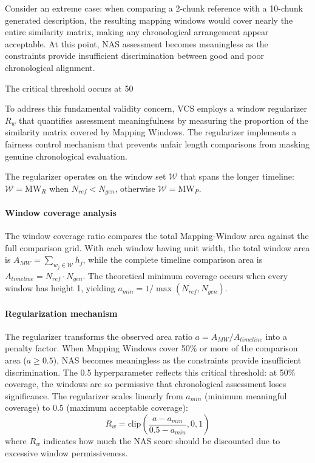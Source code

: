 \documentclass[main.tex]{subfiles}
\begin{document}
Consider an extreme case: when comparing a 2-chunk reference with a 10-chunk generated description, the resulting mapping windows would cover nearly the entire similarity matrix, making any chronological arrangement appear acceptable. At this point, NAS assessment becomes meaningless as the constraints provide insufficient discrimination between good and poor chronological alignment.

The critical threshold occurs at 50%

To address this fundamental validity concern, VCS employs a window regularizer $R_w$ that quantifies assessment meaningfulness by measuring the proportion of the similarity matrix covered by Mapping Windows. The regularizer implements a fairness control mechanism that prevents unfair length comparisons from masking genuine chronological evaluation.

The regularizer operates on the window set $\mathcal{W}$ that spans the longer timeline: $\mathcal{W} = \text{MW}_{R}$ when $N_{ref} < N_{gen}$, otherwise $\mathcal{W} = \text{MW}_{P}$.

\paragraph{Window coverage analysis}
The window coverage ratio compares the total Mapping-Window area against the full comparison grid. With each window having unit width, the total window area is $A_{MW} = \sum_{w_j \in \mathcal{W}} h_j$, while the complete timeline comparison area is $A_{timeline} = N_{ref} \cdot N_{gen}$. The theoretical minimum coverage occurs when every window has height 1, yielding $a_{min} = 1/\max(N_{ref}, N_{gen})$.

\paragraph{Regularization mechanism}
The regularizer transforms the observed area ratio $a = A_{MW}/A_{timeline}$ into a penalty factor. When Mapping Windows cover 50\% or more of the comparison area ($a \geq 0.5$), NAS becomes meaningless as the constraints provide insufficient discrimination. The 0.5 hyperparameter reflects this critical threshold: at 50\% coverage, the windows are so permissive that chronological assessment loses significance. The regularizer scales linearly from $a_{min}$ (minimum meaningful coverage) to 0.5 (maximum acceptable coverage):
\begin{equation}
R_w = \text{clip}\left(\frac{a - a_{min}}{0.5 - a_{min}}, 0, 1\right)
\end{equation}
where $R_w$ indicates how much the NAS score should be discounted due to excessive window permissiveness.
\end{document}

